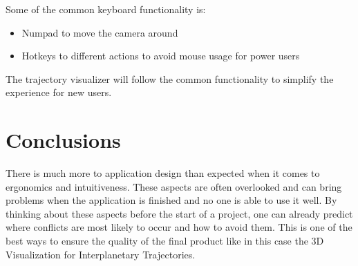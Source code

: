 \documentclass[a4paper,11pt]{article}
\begin{document}
Some of the common keyboard functionality is:
\begin{itemize}
\item Numpad to move the camera around
\item Hotkeys to different actions to avoid mouse usage for power users
\end{itemize}

The trajectory visualizer will follow the common functionality to simplify the experience for new users.


\section{Conclusions}

There is much more to application design than expected when it comes to ergonomics and intuitiveness. These aspects are often overlooked and can bring problems when the application is finished and no one is able to use it well. By thinking about these aspects before the start of a project, one can already predict where conflicts are most likely to occur and how to avoid them. This is one of the best ways to ensure the quality of the final product like in this case the 3D Visualization for Interplanetary Trajectories.



\end{document}
